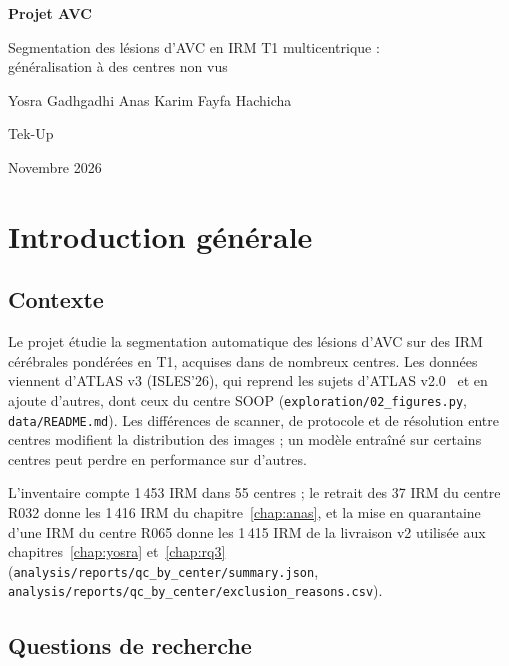 \documentclass[11pt,a4paper]{report}
\begin{document}
\begin{titlepage}
  \centering
  \vspace*{3cm}
  {\Huge\bfseries Projet AVC\par}
  \vspace{1cm}
  {\Large Segmentation des lésions d'AVC en IRM T1 multicentrique :\\ généralisation à des centres non vus\par}
  \vspace{2.5cm}
  {\large Yosra Gadhgadhi \quad Anas Karim \quad Fayfa Hachicha\par}
  \vspace{1.5cm}
  {\large Tek-Up\par}
  \vfill
  {\large Novembre 2026\par}
\end{titlepage}

\tableofcontents

\chapter*{Introduction générale}
\label{chap:introduction}

\section*{Contexte}

Le projet étudie la segmentation automatique des lésions d'AVC sur des IRM cérébrales pondérées en T1, acquises dans de nombreux centres.
Les données viennent d'ATLAS v3 (ISLES'26), qui reprend les sujets d'ATLAS v2.0~\cite{liew2022atlas} et en ajoute d'autres, dont ceux du centre SOOP (\nolinkurl{exploration/02_figures.py}, \nolinkurl{data/README.md}).
Les différences de scanner, de protocole et de résolution entre centres modifient la distribution des images ; un modèle entraîné sur certains centres peut perdre en performance sur d'autres.

L'inventaire compte 1\,453 IRM dans 55 centres ; le retrait des 37 IRM du centre R032 donne les 1\,416 IRM du chapitre~\ref{chap:anas}, et la mise en quarantaine d'une IRM du centre R065 donne les 1\,415 IRM de la livraison v2 utilisée aux chapitres~\ref{chap:yosra} et~\ref{chap:rq3} (\nolinkurl{analysis/reports/qc_by_center/summary.json}, \nolinkurl{analysis/reports/qc_by_center/exclusion_reasons.csv}).

\section*{Questions de recherche}
\end{document}
